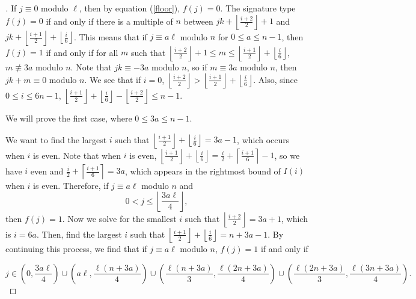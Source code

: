 \documentclass{article}
\theoremstyle{remark}
\theoremstyle{definition}
\begin{document}
\begin{proof}[]
    If $j \equiv 0$ modulo $\ell$, then by equation (\ref{floor}), $f(j) = 0$. The signature type $f(j) = 0$ if and only if there is a multiple of $n$ between $jk + \left \lfloor \frac{i+2}{2} \right \rfloor + 1$ and $jk + \left \lfloor \frac{i+1}{2} \right \rfloor + \left \lfloor \frac{i}{6} \right \rfloor$. This means that if $j \equiv a\ell$ modulo $n$ for $0 \leq a \leq n-1$, then $f(j) = 1$ if and only if for all $m$ such that $\left \lfloor \frac{i+2}{2} \right \rfloor + 1 \leq m \leq \left \lfloor \frac{i+1}{2} \right \rfloor + \left \lfloor \frac{i}{6} \right \rfloor$, $m \not \equiv 3a$ modulo $n$. Note that $jk \equiv -3a$ modulo $n$, so if $m \equiv 3a$ modulo $n$, then $jk + m \equiv 0$ modulo $n$. We see that if $i = 0$, $\left \lfloor \frac{i+2}{2} \right \rfloor > \left \lfloor \frac{i+1}{2} \right \rfloor + \left \lfloor \frac{i}{6} \right \rfloor$. Also, since $0 \leq i \leq 6n-1$, $ \left \lfloor \frac{i+1}{2} \right \rfloor + \left \lfloor \frac{i}{6} \right \rfloor - \left \lfloor \frac{i+2}{2} \right \rfloor \leq n-1$.\\
    
    \par We will prove the first case, where $0 \leq 3a \leq n-1$. 
    
    \par We want to find the largest $i$ such that $\left \lfloor \frac{i+1}{2} \right \rfloor + \left \lfloor \frac{i}{6} \right \rfloor = 3a-1$, which occurs when $i$ is even. Note that when $i$ is even, $\left \lfloor \frac{i+1}{2} \right \rfloor + \left \lfloor \frac{i}{6} \right \rfloor = \frac{i}{2} + \left \lceil \frac{i+1}{6} \right \rceil-1$, so we have $i$ even and $\frac{i}{2} + \left \lceil \frac{i+1}{6} \right \rceil = 3a$, which appears in the rightmost bound of $I(i)$ when $i$ is even. Therefore, if $j \equiv a\ell$ modulo $n$ and 
    \[0 < j \leq \left \lfloor \frac{3a\ell}{4}\right \rfloor,\]
    then $f(j) = 1$. Now we solve for the smallest $i$ such that $\left \lfloor \frac{i+2}{2}\right \rfloor = 3a+1$, which is $i = 6a$. Then, find the largest $i$ such that $\left \lfloor \frac{i+1}{2} \right \rfloor + \left \lfloor \frac{i}{6} \right \rfloor = n+3a-1$. By continuing this process, we find that if $j \equiv a\ell$ modulo $n$, $f(j)=1$ if and only if 

    \[j \in \left(0, \frac{3a\ell}{4}\right) \cup \left(a\ell, \frac{\ell(n+3a)}{4} \right) \cup \left(\frac{\ell(n+3a)}{3}, \frac{\ell(2n+3a)}{4} \right) \cup \left(\frac{\ell(2n+3a)}{3}, \frac{\ell(3n+3a)}{4} \right).\]


\end{proof}
\end{document}

